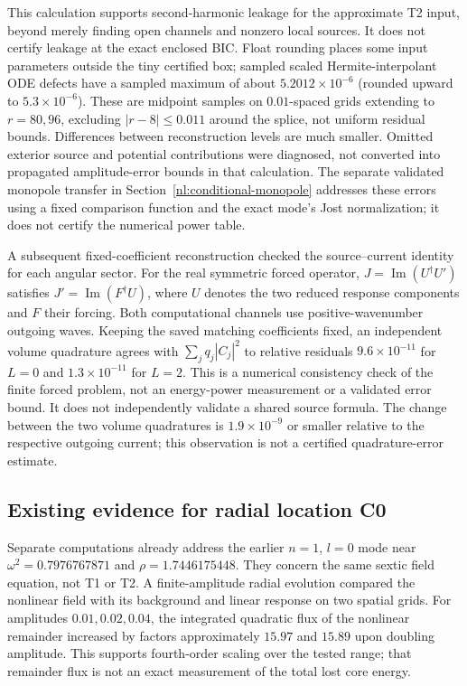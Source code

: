 This calculation supports second-harmonic leakage for the approximate T2
input, beyond merely finding open channels and nonzero local sources.
It does not certify leakage at the exact enclosed BIC. Float rounding
places some input parameters outside the tiny certified box; sampled
scaled Hermite-interpolant ODE defects have a sampled maximum of about
$5.2012\times10^{-6}$ (rounded upward to $5.3\times10^{-6}$).
These are midpoint samples on $0.01$-spaced grids extending to $r=80,96$,
excluding $|r-8|\le0.011$ around the splice, not uniform residual bounds.
Differences between reconstruction levels are much smaller. Omitted exterior
source and potential contributions were diagnosed, not converted into
propagated amplitude-error bounds in that calculation. The separate
validated monopole transfer in Section~\ref{nl:conditional-monopole}
addresses these errors using a fixed comparison function and the exact
mode's Jost normalization; it does not certify the numerical power table.

A subsequent fixed-coefficient reconstruction checked the source--current
identity for each angular sector. For the real symmetric forced operator,
$J=\operatorname{Im}(U^\dagger U')$ satisfies
$J'=\operatorname{Im}(F^\dagger U)$, where $U$ denotes the two reduced
response components and $F$ their forcing. Both computational channels
use positive-wavenumber outgoing waves. Keeping the saved matching
coefficients fixed, an independent volume quadrature agrees with
$\sum_j q_j|C_j|^2$ to relative residuals $9.6\times10^{-11}$ for $L=0$
and $1.3\times10^{-11}$ for $L=2$. This is a numerical consistency check
of the finite forced problem, not an energy-power measurement or a
validated error bound. It does not independently validate a shared source
formula. The change between the two volume quadratures is
$1.9\times10^{-9}$ or smaller relative to the respective outgoing current;
this observation is not a certified quadrature-error estimate.



\subsection{Existing evidence for radial location C0}
\label{nl:evidence}
Separate computations already address the earlier $n=1$, $l=0$ mode
near $\omega^2=0.7976767871$ and $\rho=1.7446175448$. They concern the
same sextic field equation, not T1 or T2. A finite-amplitude radial
evolution compared the nonlinear field with its background and linear
response on two spatial grids. For amplitudes $0.01,0.02,0.04$, the
integrated quadratic flux of the nonlinear remainder increased by
factors approximately $15.97$ and $15.89$ upon doubling amplitude.
This supports fourth-order scaling over the tested range; that remainder
flux is not an exact measurement of the total lost core energy.

